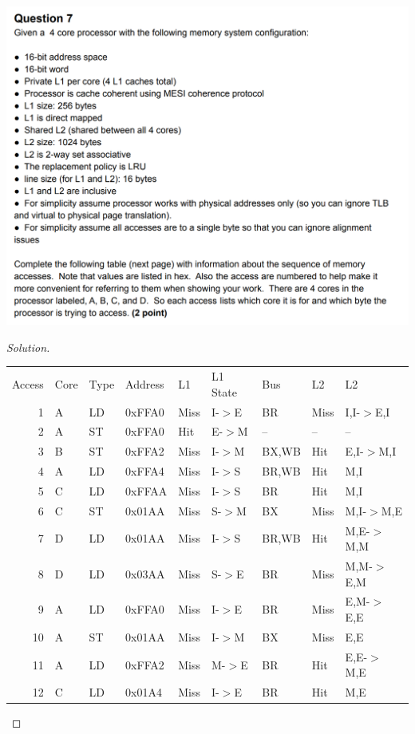 \documentclass[12pt]{article}
\begin{document}
\includegraphics[scale=0.37]{q7_q.png}\\
\begin{proof}[Solution]
	\ \\
	    \begin{tabular}{rllllllll}
		\multicolumn{1}{l}{Access} & Core  & Type  & Address & L1    & L1 State & Bus   & L2    & L2 \\
		1     & A     & LD    & 0xFFA0 & Miss  & I-$>$E  & BR    & Miss  & I,I-$>$E,I \\
		2     & A     & ST    & 0xFFA0 & Hit   & E-$>$M  & --    & --    & -- \\
		3     & B     & ST    & 0xFFA2 & Miss  & I-$>$M  & BX,WB & Hit   & E,I-$>$M,I \\
		4     & A     & LD    & 0xFFA4 & Miss  & I-$>$S  & BR,WB & Hit   & M,I \\
		5     & C     & LD    & 0xFFAA & Miss  & I-$>$S  & BR    & Hit   & M,I \\
		6     & C     & ST    & 0x01AA & Miss  & S-$>$M  & BX    & Miss  & M,I-$>$M,E \\
		7     & D     & LD    & 0x01AA & Miss  & I-$>$S  & BR,WB & Hit   & M,E-$>$M,M \\
		8     & D     & LD    & 0x03AA & Miss  & S-$>$E  & BR    & Miss  & M,M-$>$E,M \\
		9     & A     & LD    & 0xFFA0 & Miss  & I-$>$E  & BR    & Miss  & E,M-$>$E,E \\
		10    & A     & ST    & 0x01AA & Miss  & I-$>$M  & BX    & Miss  & E,E \\
		11    & A     & LD    & 0xFFA2 & Miss  & M-$>$E  & BR    & Hit   & E,E-$>$M,E \\
		12    & C     & LD    & 0x01A4 & Miss  & I-$>$E  & BR    & Hit   & M,E \\
	\end{tabular}
\end{proof}
\end{document}
